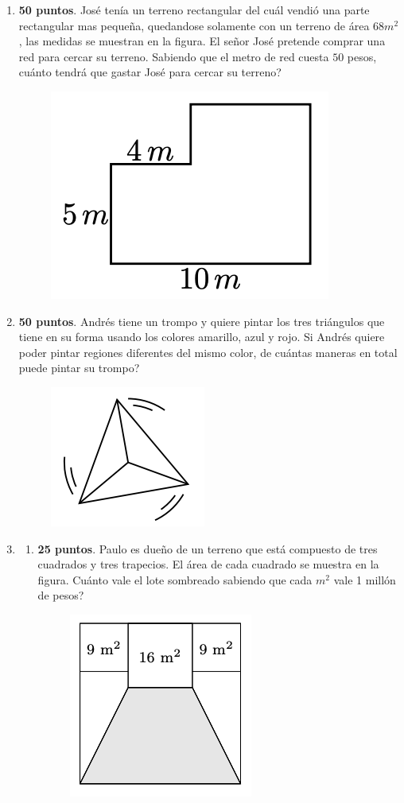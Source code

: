 \begin{enumerate}
\item \textbf{50 puntos}. José tenía un terreno rectangular del cuál vendió una parte rectangular mas pequeña, quedandose solamente con un terreno de área $68m^2$, las medidas se muestran en la figura. El señor José pretende comprar una red para cercar su terreno. Sabiendo que el metro de red cuesta $50$ pesos, cuánto tendrá que gastar José para cercar su terreno?
		\begin{figure}[H]
			\centering
			\includegraphics[width=0.4\linewidth]{2020_06_13/imgs/basic_p1}
			\label{basicp1}
		\end{figure}

\item \textbf{50 puntos}. Andrés tiene un trompo y quiere pintar los tres triángulos que tiene en su forma usando los colores amarillo, azul y rojo. Si Andrés quiere poder pintar regiones diferentes del mismo color, de cuántas maneras en total puede pintar su trompo?
		\begin{figure}[H]
			\centering
			\includegraphics[width=0.2\linewidth]{2020_06_13/imgs/basic_p2}
			\label{basicp2}
		\end{figure}


\item \hspace{1cm}
	\begin{enumerate}[label=\Alph*)]
	\item \textbf{25 puntos}. Paulo es dueño de un terreno que está compuesto de tres cuadrados y tres trapecios. El área de cada cuadrado se muestra en la figura. Cuánto vale el lote sombreado sabiendo que cada $m^2$ vale 1 millón de pesos?
			\begin{figure}[H]
				\centering
				\includegraphics[width=0.4\linewidth]{2020_06_13/imgs/basic_p3_a}
				\label{basicp3a}
			\end{figure}
		

\end{enumerate}
\end{enumerate}
